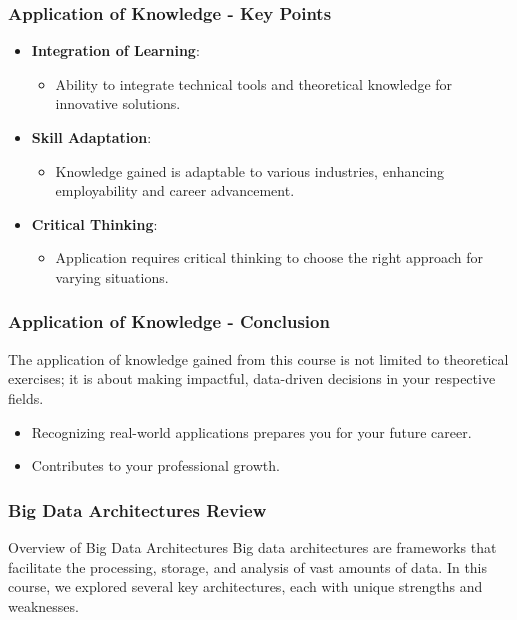 \documentclass[aspectratio=169]{beamer}
\begin{document}
\begin{frame}[fragile]
    \frametitle{Application of Knowledge - Key Points}
    \begin{itemize}
        \item \textbf{Integration of Learning}: 
            \begin{itemize}
                \item Ability to integrate technical tools and theoretical knowledge for innovative solutions.
            \end{itemize}
        \item \textbf{Skill Adaptation}:
            \begin{itemize}
                \item Knowledge gained is adaptable to various industries, enhancing employability and career advancement.
            \end{itemize}
        \item \textbf{Critical Thinking}:
            \begin{itemize}
                \item Application requires critical thinking to choose the right approach for varying situations.
            \end{itemize}
    \end{itemize}
\end{frame}

\begin{frame}[fragile]
    \frametitle{Application of Knowledge - Conclusion}
    The application of knowledge gained from this course is not limited to theoretical exercises; it is about making impactful, data-driven decisions in your respective fields. 

    \begin{itemize}
        \item Recognizing real-world applications prepares you for your future career.
        \item Contributes to your professional growth.
    \end{itemize}
\end{frame}

\begin{frame}[fragile]
    \frametitle{Big Data Architectures Review}
    \begin{block}{Overview of Big Data Architectures}
        Big data architectures are frameworks that facilitate the processing, storage, and analysis of vast amounts of data. In this course, we explored several key architectures, each with unique strengths and weaknesses.
    \end{block}
\end{frame}
\end{document}
